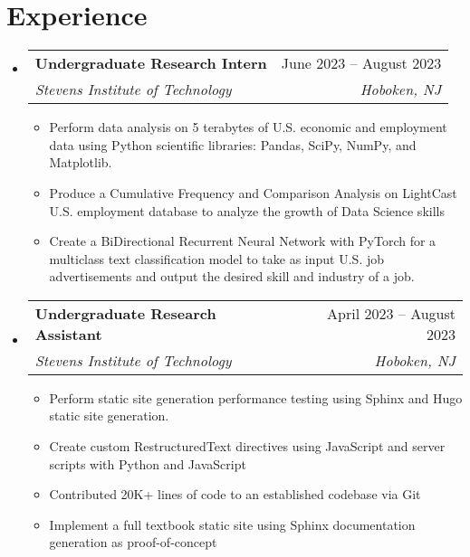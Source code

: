 \documentclass[letterpaper,11pt]{article}
\makeatletter
\newcommand{\resumeItem}[1]{
  \item\small{
    {#1 \vspace{-2pt}}
  }
}
\newcommand{\resumeSubheading}[4]{
  \vspace{-2pt}\item
    \begin{tabular*}{0.97\textwidth}[t]{l@{\extracolsep{\fill}}r}
      \textbf{#1} & #2 \\
      \textit{\small#3} & \textit{\small #4} \\
    \end{tabular*}\vspace{-7pt}
}
\newcommand{\resumeSubSubheading}[2]{
    \item
    \begin{tabular*}{0.97\textwidth}{l@{\extracolsep{\fill}}r}
      \textit{\small#1} & \textit{\small #2} \\
    \end{tabular*}\vspace{-7pt}
}
\newcommand{\resumeSubHeadingListStart}{\begin{itemize}[leftmargin=0.15in, label={}]}
\newcommand{\resumeSubHeadingListEnd}{\end{itemize}}
\newcommand{\resumeItemListStart}{\begin{itemize}}
\newcommand{\resumeItemListEnd}{\end{itemize}\vspace{-5pt}}
\makeatother
\begin{document}
\section{Experience}
  \resumeSubHeadingListStart

    \resumeSubheading
      {Undergraduate Research Intern}{June 2023 -- August 2023}
      {Stevens Institute of Technology}{Hoboken, NJ}
      \resumeItemListStart
        \resumeItem{Perform data analysis on 5 terabytes of U.S. economic and employment data using Python scientific libraries: Pandas, SciPy, NumPy, and Matplotlib.}
        \resumeItem{Produce a Cumulative Frequency and Comparison Analysis on LightCast U.S. employment database to analyze the growth of Data Science skills}
        \resumeItem{Create a BiDirectional Recurrent Neural Network with PyTorch for a multiclass text classification model to take as input U.S. job advertisements and output the desired skill and industry of a job.}
      \resumeItemListEnd
      
    \resumeSubheading
      {Undergraduate Research Assistant}{April 2023 -- August 2023}
      {Stevens Institute of Technology}{Hoboken, NJ}
      \resumeItemListStart
        \resumeItem{Perform static site generation performance testing using Sphinx and Hugo static site generation.}
        \resumeItem{Create custom RestructuredText directives using JavaScript and server scripts with Python and JavaScript}
        \resumeItem{Contributed 20K+ lines of code to an established codebase via Git}
        \resumeItem{Implement a full textbook static site using Sphinx documentation generation as proof-of-concept}
      \resumeItemListEnd

  \resumeSubHeadingListEnd


\end{document}
